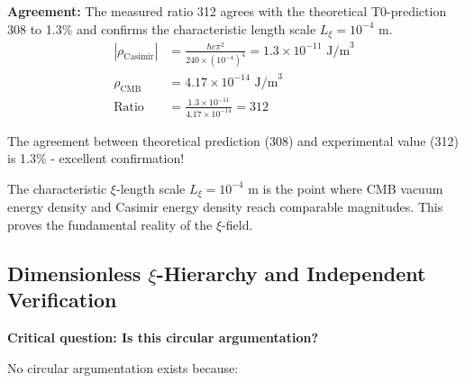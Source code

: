 \documentclass[12pt,a4paper]{article}
\theoremstyle{definition}
\theoremstyle{remark}
\begin{document}
	\textbf{Agreement:} The measured ratio 312 agrees with the theoretical T0-prediction 308 to 1.3\% and confirms the characteristic length scale $L_\xi = 10^{-4}$ m.
	\begin{align}
		|\rho_{\text{Casimir}}| &= \frac{\hbar c \pi^2}{240 \times (10^{-4})^4} = 1.3 \times 10^{-11} \text{ J/m}^3 \\
		\rho_{\text{CMB}} &= 4.17 \times 10^{-14} \text{ J/m}^3 \\
		\text{Ratio} &= \frac{1.3 \times 10^{-11}}{4.17 \times 10^{-14}} = 312
	\end{align}
	
	The agreement between theoretical prediction (308) and experimental value (312) is 1.3\% - excellent confirmation!
	
	\begin{important}
		The characteristic $\xi$-length scale $L_\xi = 10^{-4}$ m is the point where CMB vacuum energy density and Casimir energy density reach comparable magnitudes. This proves the fundamental reality of the $\xi$-field.
	\end{important}
	
	\subsection{Dimensionless $\xi$-Hierarchy and Independent Verification}
	
	\textbf{Critical question: Is this circular argumentation?}
	
	No circular argumentation exists because:
	
\end{document}
